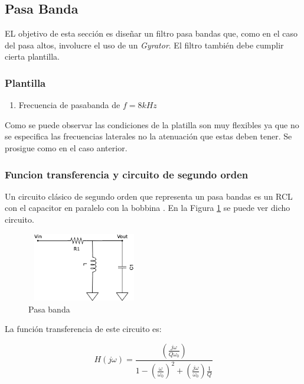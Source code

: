 \subsection{Pasa Banda}

EL objetivo de esta sección es diseñar un filtro pasa bandas que, como en el caso del pasa altos, involucre el uso de un \textit{Gyrator}. El filtro también debe cumplir cierta plantilla.

\subsubsection{Plantilla}

\begin{enumerate}
	\item Frecuencia de pasabanda de $f = 8kHz$	
\end{enumerate}

Como se puede observar las condiciones de la platilla son muy flexibles ya que no se especifica las frecuencias laterales no la atenuación que estas deben tener. Se prosigue como en el caso anterior. 

\subsubsection{Funcion transferencia y circuito de segundo orden}

Un circuito clásico de segundo orden que representa un pasa bandas es un RCL con el capacitor en paralelo con la bobbina . En la Figura \ref{ej2_filto_BP} se puede ver dicho circuito. 

\begin{figure}[h!]                                                       
    \centering\includegraphics[width=5cm, height=3cm]{../Ex2/Resources/ej2_bp.png}
    \caption{Pasa banda}
    \label{ej2_filto_BP}
    \end{figure}


La función transferencia de este circuito es:


\begin{equation} H(j\omega) = \frac{(\frac{j\omega}{Q\omega_0})}{1 - (\frac{\omega}{\omega_0})^{2} + (\frac{j\omega}{\omega_0})\frac{1}{Q}} \label{equ:trans_clasica_bp}\end{equation}  

